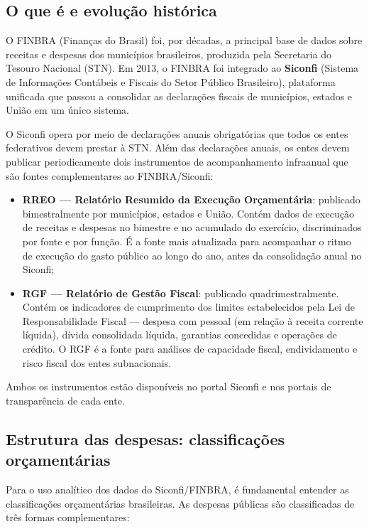 \subsection{O que é e evolução histórica}

O FINBRA (Finanças do Brasil) foi, por décadas, a principal base de dados sobre receitas e despesas dos municípios brasileiros, produzida pela Secretaria do Tesouro Nacional (STN). Em 2013, o FINBRA foi integrado ao \textbf{Siconfi} (Sistema de Informações Contábeis e Fiscais do Setor Público Brasileiro), plataforma unificada que passou a consolidar as declarações fiscais de municípios, estados e União em um único sistema.

O Siconfi opera por meio de declarações anuais obrigatórias que todos os entes federativos devem prestar à STN. Além das declarações anuais, os entes devem publicar periodicamente dois instrumentos de acompanhamento infraanual que são fontes complementares ao FINBRA/Siconfi:

\begin{itemize}
  \item \textbf{RREO --- Relatório Resumido da Execução Orçamentária}: publicado bimestralmente por municípios, estados e União. Contém dados de execução de receitas e despesas no bimestre e no acumulado do exercício, discriminados por fonte e por função. É a fonte mais atualizada para acompanhar o ritmo de execução do gasto público ao longo do ano, antes da consolidação anual no Siconfi;

  \item \textbf{RGF --- Relatório de Gestão Fiscal}: publicado quadrimestralmente. Contém os indicadores de cumprimento dos limites estabelecidos pela Lei de Responsabilidade Fiscal --- despesa com pessoal (em relação à receita corrente líquida), dívida consolidada líquida, garantias concedidas e operações de crédito. O RGF é a fonte para análises de capacidade fiscal, endividamento e risco fiscal dos entes subnacionais.
\end{itemize}

Ambos os instrumentos estão disponíveis no portal Siconfi e nos portais de transparência de cada ente.

\subsection{Estrutura das despesas: classificações orçamentárias}

Para o uso analítico dos dados do Siconfi/FINBRA, é fundamental entender as classificações orçamentárias brasileiras. As despesas públicas são classificadas de três formas complementares:

